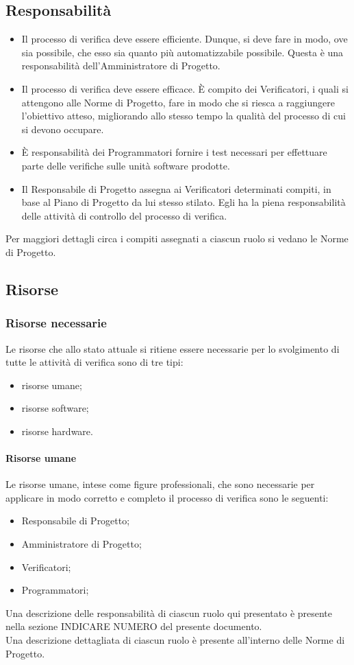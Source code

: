 		\subsection{Responsabilità}
			\begin{itemize}
				\item Il processo di verifica deve essere efficiente. Dunque, si deve fare in modo, ove sia possibile, che esso sia quanto più automatizzabile 
				possibile. Questa è una responsabilità dell'Amministratore di Progetto.
				\item Il processo di verifica deve essere efficace. È compito dei Verificatori, i quali si attengono alle Norme di Progetto, fare in modo che 
				si riesca a raggiungere l'obiettivo atteso, migliorando allo stesso tempo la qualità del processo di cui si devono occupare.
				\item È responsabilità dei Programmatori fornire i test necessari per effettuare parte delle verifiche sulle unità software prodotte.
				\item Il Responsabile di Progetto assegna ai Verificatori determinati compiti, in base al Piano di Progetto da lui stesso stilato. Egli ha la 
				piena responsabilità delle attività di controllo del processo di verifica.
			\end{itemize}
			Per maggiori dettagli circa i compiti assegnati a ciascun ruolo si vedano le Norme di Progetto.
		\subsection{Risorse}
			\subsubsection{Risorse necessarie}
				Le risorse che allo stato attuale si ritiene essere necessarie per lo svolgimento di tutte le attività di verifica 
				sono di tre tipi:
				\begin{itemize}
					\item risorse umane;
					\item risorse software;
					\item risorse hardware.
				\end{itemize}
				\paragraph{Risorse umane}
					Le risorse umane, intese come figure professionali, che sono necessarie per applicare in modo corretto e completo il processo di 
					verifica sono le seguenti:
					\begin{itemize}
						\item Responsabile di Progetto;
						\item Amministratore di Progetto;
						\item Verificatori;
						\item Programmatori;
					\end{itemize}
					Una descrizione delle responsabilità di ciascun ruolo qui presentato è presente nella sezione INDICARE NUMERO del presente documento.\\
					Una descrizione dettagliata di ciascun ruolo è presente all'interno delle Norme di Progetto.
